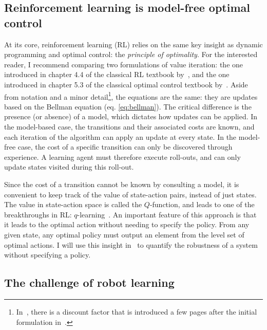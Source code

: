 \subsection{Reinforcement learning is model-free optimal control}
At its core, reinforcement learning (RL) relies on the same key insight as dynamic programming and optimal control: the \emph{principle of optimality}.
For the interested reader, I recommend comparing two formulations of value iteration: the one introduced in chapter 4.4 of the classical RL textbook by~\textcite{sutton2018book}, and the one introduced in chapter 5.3 of the classical optimal control textbook by~\textcite{bertsekas2017book}. Aside from notation and a minor detail\footnote{In~\cite{sutton2018book}, there is a discount factor that is introduced a few pages after the initial formulation in~\cite{bertsekas2017book}.}, the equations are the same: they are updates based on the Bellman equation (eq. \ref{eq:bellman}). The critical difference is the presence (or absence) of a model, which dictates how updates can be applied.
In the model-based case, the transitions and their associated costs are known, and each iteration of the algorithm can apply an update at every state. In the model-free case, the cost of a specific transition can only be discovered through experience. A learning agent must therefore execute roll-outs, and can only update states visited during this roll-out. \par
Since the cost of a transition cannot be known by consulting a model, it is convenient to keep track of the value of state-action pairs, instead of just states. The value in state-action space is called the $Q$-function, and leads to one of the breakthroughs in RL: $q$-learning~\cite[cf. chapter 6.5]{sutton2018book}. An important feature of this approach is that it leads to the optimal action without needing to specify the policy. From any given state, any optimal policy must output an element from the level set of optimal actions. I will use this insight in~\cite{heim2019beyond} to quantify the robustness of a system without specifying a policy.

\subsection{The challenge of robot learning}


